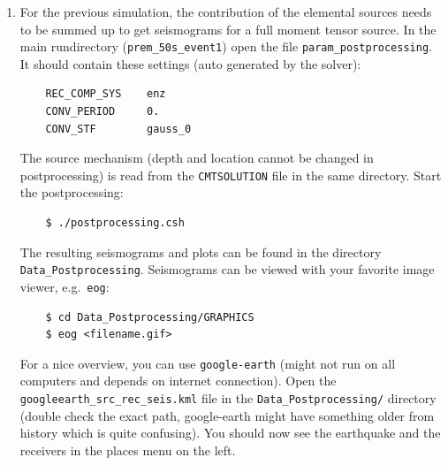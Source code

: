 \documentclass{article}
\begin{document}
\begin{enumerate}
    \item For the previous simulation, the contribution of the elemental sources needs
    to be summed up to get seismograms for a full moment tensor source. In the
    main rundirectory (\verb|prem_50s_event1|) open the file
    \verb|param_postprocessing|. It should contain these settings (auto generated by the
    solver):
    \begin{verbatim}
    REC_COMP_SYS    enz
    CONV_PERIOD     0.
    CONV_STF        gauss_0
    \end{verbatim}
    The source mechanism (depth and location cannot be changed in postprocessing) is read
    from the \verb|CMTSOLUTION| file in the same directory. Start the postprocessing:
    \begin{verbatim}
    $ ./postprocessing.csh
    \end{verbatim}
    The resulting seismograms and plots can be found in the directory 
    \verb|Data_Postprocessing|. Seismograms can be viewed with your favorite image viewer,
    e.g.\ \verb|eog|:
    \begin{verbatim}
    $ cd Data_Postprocessing/GRAPHICS
    $ eog <filename.gif>
    \end{verbatim}
    For a nice overview, you can use \verb|google-earth| (might not run on all computers
    and depends on internet connection). Open the \verb|googleearth_src_rec_seis.kml| file
    in the \verb|Data_Postprocessing/| directory (double check the exact path,
    google-earth might have something older from history which is quite confusing).
    You should now see the earthquake and the receivers in the places menu on the left.
    

\end{enumerate}
\end{document}

